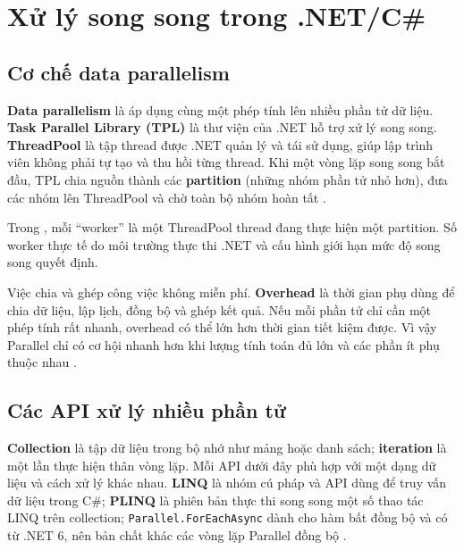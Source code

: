 \section{Xử lý song song trong .NET/C\#}

\subsection{Cơ chế data parallelism}

\textbf{Data parallelism} là áp dụng cùng một phép tính lên nhiều phần tử dữ liệu.
\textbf{Task Parallel Library (TPL)} là thư viện của .NET hỗ trợ xử lý song song.
\textbf{ThreadPool} là tập thread được .NET quản lý và tái sử dụng, giúp lập trình
viên không phải tự tạo và thu hồi từng thread. Khi một vòng lặp song song bắt đầu,
TPL chia nguồn thành các
\textbf{partition} (những nhóm phần tử nhỏ hơn), đưa các nhóm lên ThreadPool và chờ
toàn bộ nhóm hoàn tất \cite{ms-tpl,ms-threadpool,ms-data-parallelism}.

Trong , mỗi ``worker'' là một ThreadPool thread đang thực hiện một partition.
Số worker thực tế do môi trường thực thi .NET và cấu hình giới hạn mức độ song song
quyết định.

\begin{center}
\resizebox{0.80\textwidth}{!}{}
\label{fig:parallel-flow}
\end{center}

Việc chia và ghép công việc không miễn phí. \textbf{Overhead} là thời gian phụ dùng
để chia dữ liệu, lập lịch, đồng bộ và ghép kết quả. Nếu mỗi phần tử chỉ cần một phép
tính rất nhanh, overhead có thể lớn hơn thời gian tiết kiệm được. Vì vậy Parallel
chỉ có cơ hội nhanh hơn khi lượng tính toán đủ lớn và các phần ít phụ thuộc nhau
\cite{ms-plinq-speedup}.

\subsection{Các API xử lý nhiều phần tử}

\textbf{Collection} là tập dữ liệu trong bộ nhớ như mảng hoặc danh sách;
\textbf{iteration} là một lần thực hiện thân vòng lặp. Mỗi API dưới đây phù hợp với
một dạng dữ liệu và cách xử lý khác nhau.
\textbf{LINQ} là nhóm cú pháp và API dùng để truy vấn dữ liệu trong C\#;
\textbf{PLINQ} là phiên bản thực thi song song một số thao tác LINQ trên collection;
\texttt{Parallel.ForEachAsync} dành cho hàm bất đồng bộ và có từ .NET 6, nên bản
chất khác các vòng lặp Parallel đồng bộ \cite{ms-parallel-api}.

